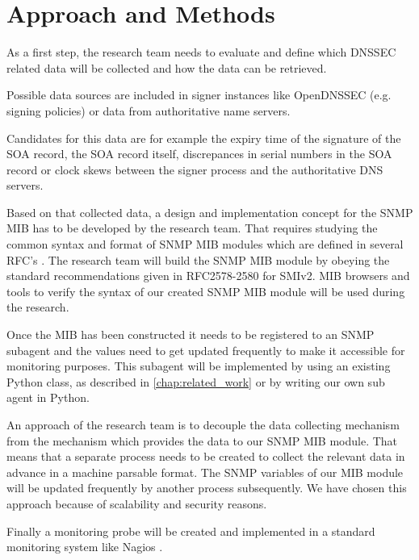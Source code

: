 \section{Approach and Methods}
\label{chap:approach_and_methods}
As a first step, the research team needs to evaluate and define which DNSSEC related data will be collected and how the data can be retrieved.

Possible data sources are included in signer instances like OpenDNSSEC \cite{opendnssec} (e.g. signing policies) or data from authoritative name servers. 

Candidates for this data are for example the expiry time of the signature of the SOA record, the SOA record itself, discrepances in serial numbers in the SOA record or clock skews between the signer process and the authoritative DNS servers. 

Based on that collected data, a design and implementation concept for the SNMP MIB has to be developed by the research team. That requires studying the common syntax and format of SNMP MIB modules which are defined in several RFC's \cite{snmp-rfc}. The research team will build  the SNMP MIB module by obeying the standard recommendations given in RFC2578-2580 for SMIv2. MIB browsers \cite{mibbrowser} and tools to verify the syntax \cite{mibchecker} of our created SNMP MIB module will be used during the research. 

Once the MIB has been constructed it needs to be registered to an SNMP subagent and the values need to get updated frequently to make it accessible for monitoring purposes. This subagent will be implemented by using an existing Python class, as described in \ref{chap:related_work} or by writing our own sub agent in Python.

An approach of the research team is to decouple the data collecting mechanism from the mechanism which provides the data to our SNMP MIB module. That means that a separate process needs to be created to collect the relevant data in advance in a machine parsable format. The SNMP variables of our MIB module will be updated frequently by another process subsequently. We have chosen this approach because of scalability and security reasons. 

Finally a monitoring probe will be created and implemented in a standard monitoring system like Nagios \cite{nagios}. 

